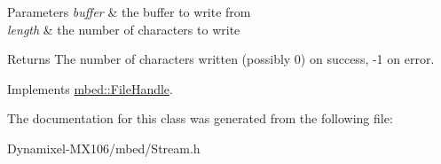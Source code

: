 \begin{DoxyParams}{Parameters}
{\em buffer} & the buffer to write from \\
\hline
{\em length} & the number of characters to write\\
\hline
\end{DoxyParams}
\begin{DoxyReturn}{Returns}
The number of characters written (possibly 0) on success, -\/1 on error. 
\end{DoxyReturn}


Implements \hyperlink{classmbed_1_1_file_handle_afecb50bd072d06e2a56dbc4f4e68bbf5}{mbed\+::\+File\+Handle}.



The documentation for this class was generated from the following file\+:\begin{DoxyCompactItemize}
\item 
Dynamixel-\/\+M\+X106/mbed/Stream.\+h\end{DoxyCompactItemize}
